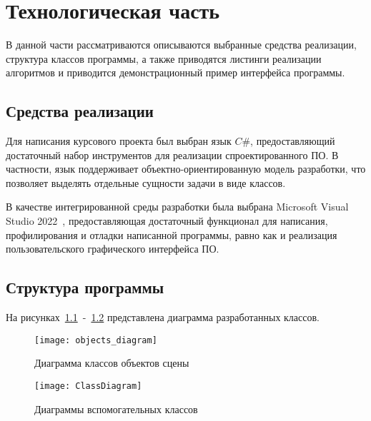 \chapter{Технологическая часть}

В данной части рассматриваются описываются выбранные средства реализации, структура классов программы, а также приводятся листинги реализации алгоритмов и приводится демонстрационный пример интерфейса программы.

\section{Средства реализации}
Для написания курсового проекта был выбран язык $C\#$\cite{}, предоставляющий достаточный набор инструментов для реализации спроектированного ПО. В частности, язык поддерживает объектно-ориентированную модель разработки, что позволяет выделять отдельные сущности задачи в виде классов.

В качестве интегрированной среды разработки была выбрана Microsoft Visual Studio 2022~\cite{}, предоставляющая достаточный функционал для написания, профилирования и отладки написанной программы, равно как и реализация пользовательского графического интерфейса ПО.

\section{Структура программы}
На рисунках~\ref{fig:SceneObjects}~-~\ref{fig:ClassDiagram} представлена диаграмма разработанных классов.
\begin{figure}[H]
	\centering
	\texttt{[image: objects\_diagram]}
	\caption{Диаграмма классов объектов сцены}
	\label{fig:SceneObjects}
\end{figure}

\begin{figure}[H]
	\centering
	\texttt{[image: ClassDiagram]}
	\caption{Диаграммы вспомогательных классов}
	\label{fig:ClassDiagram}
\end{figure}

